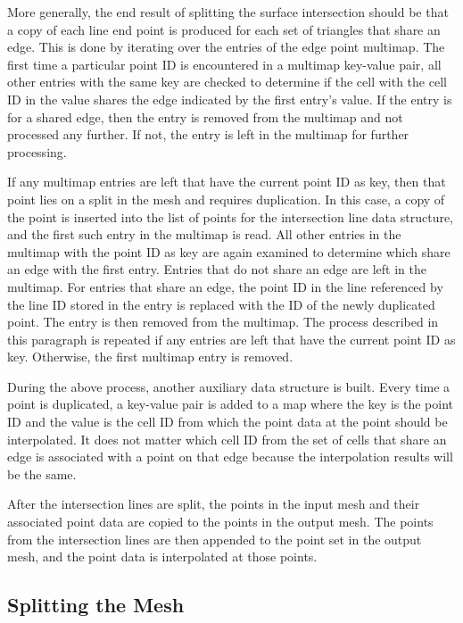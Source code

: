 \documentclass{InsightArticle}
\begin{document}
More generally, the end result of splitting the surface intersection should be that a copy of each line end point is produced for each set of triangles that share an edge. This is done by iterating over the entries of the edge point multimap. The first time a particular point ID is encountered in a multimap key-value pair, all other entries with the same key are checked to determine if the cell with the cell ID in the value shares the edge indicated by the first entry's value. If the entry is for a shared edge, then the entry is removed from the multimap and not processed any further. If not, the entry is left in the multimap for further processing.

If any multimap entries are left that have the current point ID as key, then that point lies on a split in the mesh and requires duplication. In this case, a copy of the point is inserted into the list of points for the intersection line data structure, and the first such entry in the multimap is read. All other entries in the multimap with the point ID as key are again examined to determine which share an edge with the first entry. Entries that do not share an edge are left in the multimap. For entries that share an edge, the point ID in the line referenced by the line ID stored in the entry is replaced with the ID of the newly duplicated point. The entry is then removed from the multimap. The process described in this paragraph is repeated if any entries are left that have the current point ID as key. Otherwise, the first multimap entry is removed.

During the above process, another auxiliary data structure is built. Every time a point is duplicated, a key-value pair is added to a map where the key is the point ID and the value is the cell ID from which the point data at the point should be interpolated. It does not matter which cell ID from the set of cells that share an edge is associated with a point on that edge because the interpolation results will be the same.

After the intersection lines are split, the points in the input mesh and their associated point data are copied to the points in the output mesh. The points from the intersection lines are then appended to the point set in the output mesh, and the point data is interpolated at those points. 

\subsection{Splitting the Mesh}
\end{document}
